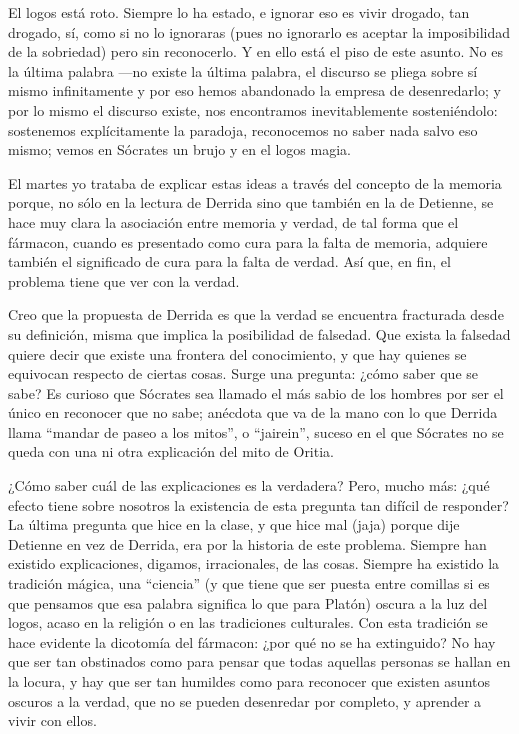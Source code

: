 El logos está roto. Siempre lo ha estado, e
ignorar eso es vivir drogado, tan drogado,
sí, como si no lo ignoraras (pues no
ignorarlo es aceptar la imposibilidad de la
sobriedad) pero sin reconocerlo. Y en ello
está el piso de este asunto. No es la última
palabra ---no existe la última palabra, el
discurso se pliega sobre sí mismo
infinitamente y por eso hemos abandonado la
empresa de desenredarlo; y por lo mismo el
discurso existe, nos encontramos
inevitablemente sosteniéndolo: sostenemos
explícitamente la paradoja, reconocemos no
saber nada salvo eso mismo; vemos en Sócrates
un brujo y en el logos magia.

El martes yo trataba de explicar estas ideas
a través del concepto de la memoria porque,
no sólo en la lectura de Derrida sino que
también en la de Detienne, se hace muy clara
la asociación entre memoria y verdad, de tal
forma que el fármacon, cuando es presentado
como cura para la falta de memoria, adquiere
también el significado de cura para la falta
de verdad. Así que, en fin, el problema tiene
que ver con la verdad.

Creo que la propuesta de Derrida es que la
verdad se encuentra fracturada desde su
definición, misma que implica la posibilidad
de falsedad. Que exista la falsedad quiere
decir que existe una frontera del
conocimiento, y que hay quienes se equivocan
respecto de ciertas cosas. Surge una
pregunta: ¿cómo saber que se sabe? Es curioso
que Sócrates sea llamado el más sabio de los
hombres por ser el único en reconocer que no
sabe; anécdota que va de la mano con lo que
Derrida llama ``mandar de paseo a los
mitos'', o ``jairein'', suceso en el que
Sócrates no se queda con una ni otra
explicación del mito de Oritia.

¿Cómo saber cuál de las explicaciones es la
verdadera? Pero, mucho más: ¿qué efecto tiene
sobre nosotros la existencia de esta pregunta
tan difícil de responder? La última pregunta
que hice en la clase, y que hice mal (jaja)
porque dije Detienne en vez de Derrida, era
por la historia de este problema. Siempre han
existido explicaciones, digamos,
irracionales, de las cosas. Siempre ha
existido la tradición mágica, una ``ciencia''
(y que tiene que ser puesta entre comillas si
es que pensamos que esa palabra significa lo
que para Platón) oscura a la luz del logos,
acaso en la religión o en las tradiciones
culturales. Con esta tradición se hace
evidente la dicotomía del fármacon: ¿por qué
no se ha extinguido? No hay que ser tan
obstinados como para pensar que todas
aquellas personas se hallan en la locura, y
hay que ser tan humildes como para reconocer
que existen asuntos oscuros a la verdad, que
no se pueden desenredar por completo, y
aprender a vivir con ellos.

